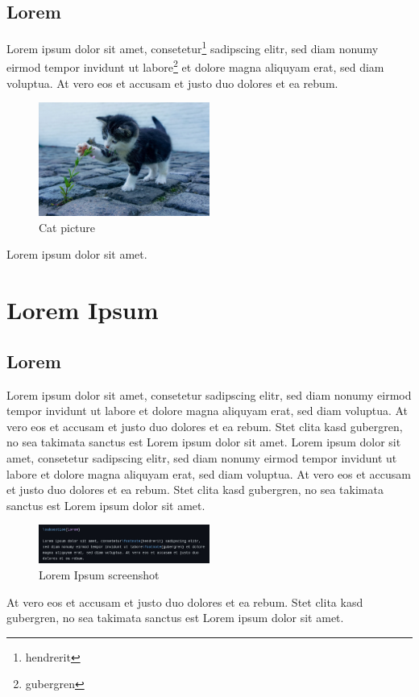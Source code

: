 \documentclass[12pt]{scrartcl}
\begin{document}
\subsection{Lorem}

Lorem ipsum dolor sit amet, consetetur\footnote{hendrerit} sadipscing elitr,
sed diam nonumy eirmod tempor invidunt ut labore\footnote{gubergren} et dolore
magna aliquyam erat, sed diam voluptua. At vero eos et accusam et justo duo
dolores et ea rebum.

\begin{figure}[H]
    \centering
    \includegraphics[width=0.5\textwidth]{template-cat1.jpg}
    \caption{Cat picture}
\end{figure}

Lorem ipsum dolor sit amet.

\newpage

\section{Lorem Ipsum}

\subsection{Lorem}

Lorem ipsum dolor sit amet, consetetur sadipscing elitr, sed diam nonumy eirmod
tempor invidunt ut labore et dolore magna aliquyam erat, sed diam voluptua. At
vero eos et accusam et justo duo dolores et ea rebum. Stet clita kasd
gubergren, no sea takimata sanctus est Lorem ipsum dolor sit amet. Lorem ipsum
dolor sit amet, consetetur sadipscing elitr, sed diam nonumy eirmod tempor
invidunt ut labore et dolore magna aliquyam erat, sed diam voluptua. At vero
eos et accusam et justo duo dolores et ea rebum. Stet clita kasd gubergren, no
sea takimata sanctus est Lorem ipsum dolor sit amet.

\begin{figure}[H]
    \centering
    \includegraphics[width=0.5\textwidth]{template-lorem1.jpg}
    \caption{Lorem Ipsum screenshot}
\end{figure}

At vero eos et accusam et justo duo dolores et ea rebum. Stet clita kasd
gubergren, no sea takimata sanctus est Lorem ipsum dolor sit amet.
\end{document}
